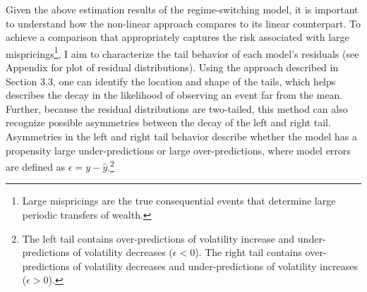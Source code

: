 \documentclass[11pt,a4paper,oldfontcommands]{memoir}
\begin{document}
{Given the above estimation results of the regime-switching model, it is important to understand how the non-linear approach compares to its linear counterpart. To achieve a comparison that appropriately captures the risk associated with large mispricings\footnote{Large mispricings are the true consequential events that determine large periodic transfers of wealth.}, I aim to characterize the tail behavior of each model's residuals (see Appendix for plot of residual distributions). Using the approach described in Section 3.3, one can identify the location and shape of the tails, which helps describes the decay in the likelihood of observing an event far from the mean. Further, because the residual distributions are two-tailed, this method can also recognize possible asymmetries between the decay of the left and right tail. Asymmetries in the left and right tail behavior describe whether the model has a propensity large under-predictions or large over-predictions, where model errors are defined as $\epsilon= y - \hat{y}$.\footnote{The left tail contains over-predictions of volatility increase and under-predictions of volatility decreases ($\epsilon < 0$). The right tail contains over-predictions of volatility decreases and under-predictions of volatility increases ($\epsilon > 0$).} 

}
\end{document}
